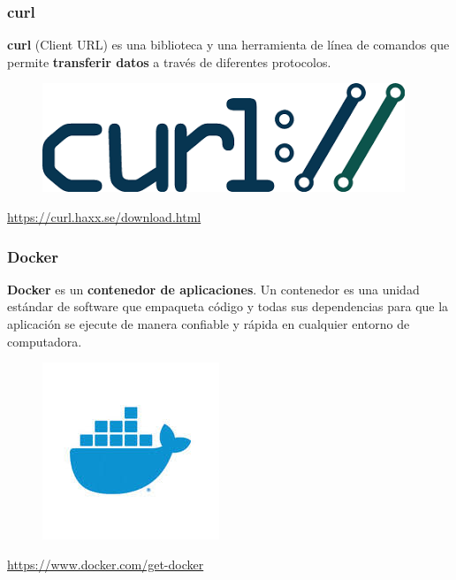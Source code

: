 \documentclass{beamer}
\begin{document}
	\begin{frame}
		\frametitle{curl}
		\textbf{curl} (Client URL) es una biblioteca y una herramienta de línea de comandos que permite \textbf{transferir datos} a través de diferentes protocolos.
		\begin{figure}[h]
			\includegraphics[scale=.3]{curl}
			\centering
		\end{figure}
		\begin{center}
			\tiny{\url{https://curl.haxx.se/download.html}}
		\end{center}
	\end{frame}

	\begin{frame}
		\frametitle{Docker}
		\textbf{Docker} es un \textbf{contenedor de aplicaciones}. Un contenedor es una unidad estándar de software que empaqueta código y todas sus dependencias para que la aplicación se ejecute de manera confiable y rápida en cualquier entorno de computadora.
		\begin{figure}[h]
			\includegraphics[scale=.3]{docker}
			\centering
		\end{figure}
		\begin{center}
			\tiny{\url{https://www.docker.com/get-docker}}
		\end{center}
	\end{frame}
	
\end{document}
